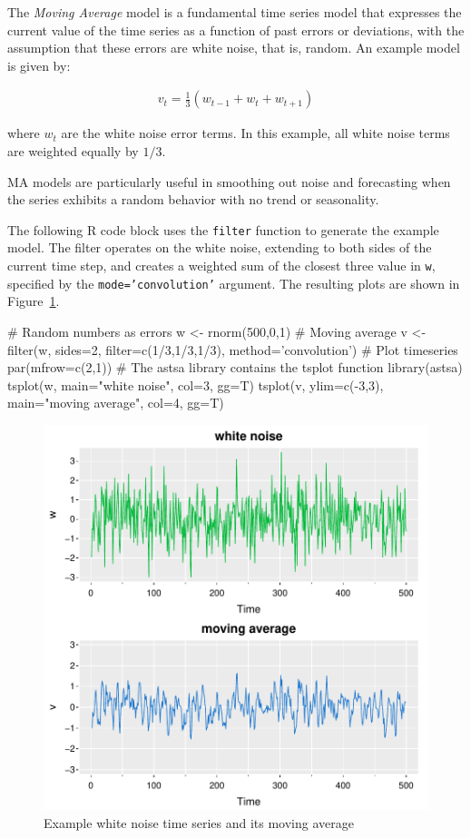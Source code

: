 The \emph{Moving Average} model is a fundamental time series model that expresses the current value of the time series as a function of past errors or deviations, with the assumption that these errors are white noise, that is, random. An example model is given by: 

\begin{align*}v_t = \frac{1}{3} ( w_{t-1} + w_t + w_{t+1})
\end{align*}

\noindent where $w_t$ are the white noise error terms. In this example, all white noise terms are weighted equally by $1/3$.

MA models are particularly useful in smoothing out noise and forecasting when the series exhibits a random behavior with no trend or seasonality.

The following R code block uses the \texttt{filter} function to generate the example model. The filter operates on the white noise, extending to both sides of the current time step, and creates a weighted sum of the closest three value in \texttt{w}, specified by the \texttt{mode='convolution'} argument. The resulting plots are shown in Figure~\ref{fig:figure2}. 

\begin{samepage}
\begin{Rcode}
# Random numbers as errors
w <- rnorm(500,0,1)
# Moving average
v <- filter(w, sides=2, filter=c(1/3,1/3,1/3), method='convolution')
# Plot timeseries
par(mfrow=c(2,1))
# The astsa library contains the tsplot function
library(astsa)
tsplot(w, main="white noise", col=3, gg=T)
tsplot(v, ylim=c(-3,3), main="moving average", col=4, gg=T)
\end{Rcode}
\end{samepage}

\begin{figure}
\centering

\includegraphics[width=.75\textwidth]{figure2.pdf}
\caption{Example white noise time series and its moving average}
\label{fig:figure2}
\end{figure}

